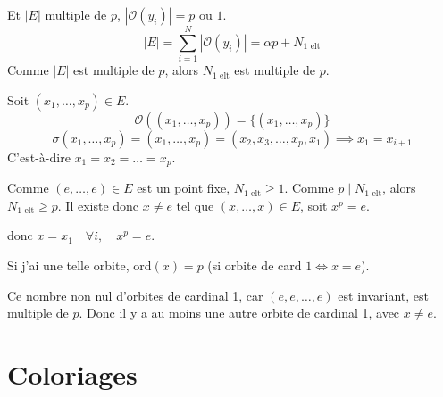 Et $|E|$ multiple de $p$, $|\mathcal{O}(y_i)| = p \text{ ou } 1$.
\[ |E| = \sum_{i=1}^N |\mathcal{O}(y_i)| = \alpha p + N_{\text{1 elt}} \]
Comme $|E|$ est multiple de $p$, alors $N_{\text{1 elt}}$ est multiple de $p$.

Soit $(x_1, \dots, x_p) \in E$.
\[ \mathcal{O}((x_1, \dots, x_p)) = \{(x_1, \dots, x_p)\} \]
\[ \sigma(x_1, \dots, x_p) = (x_1, \dots, x_p) = (x_2, x_3, \dots, x_p, x_1) \implies x_1 = x_{i+1} \]
C'est-à-dire $x_1 = x_2 = \dots = x_p$.

Comme $(e, \dots, e) \in E$ est un point fixe, $N_{\text{1 elt}} \geqslant 1$.
Comme $p \mid N_{\text{1 elt}}$, alors $N_{\text{1 elt}} \geqslant p$.
Il existe donc $x \neq e$ tel que $(x, \dots, x) \in E$, soit $x^p = e$.

\noindent donc $x = x_1 \quad \forall i, \quad x^p = e$.

Si j'ai une telle orbite, $\text{ord}(x) = p$ (si orbite de card $1 \iff x=e$).

Ce nombre non nul d'orbites de cardinal 1, car $(e, e, \dots, e)$ est invariant, est multiple de $p$.
Donc il y a au moins une autre orbite de cardinal 1, avec $x \neq e$.
\hfill \faCheckCircle

\vspace{1cm}

\section*{Coloriages}

\begin{center}
\end{center}

